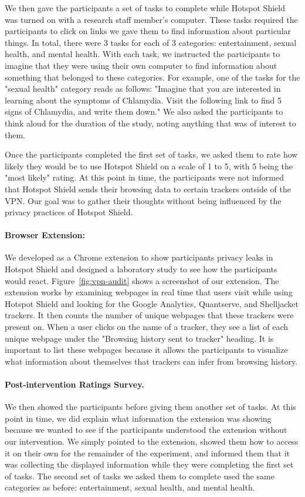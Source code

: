 We then gave the participants a set of tasks to complete while Hotspot Shield
was turned on with a research staff member's computer.  These tasks required
the participants to click on links we gave them to find information about
particular things.  In total, there were 3 tasks for each of 3 categories:
entertainment, sexual health, and mental health.  With each task, we
instructed the participants to imagine that they were using their own computer
to find information about something that belonged to these categories.  For
example, one of the tasks for the "sexual health" category reads as follows:
"Imagine that you are interested in learning about the symptoms of Chlamydia.
Visit the following link to find 5 signs of Chlamydia, and write them down."
We also asked the participants to think aloud for the duration of the study,
noting anything that was of interest to them.

Once the participants completed the first set of tasks, we asked them to rate
how likely they would be to use Hotspot Shield on a scale of 1 to 5, with 5
being the "most likely" rating.  At this point in time, the participants were not
informed that Hotspot Shield sends their browsing data to certain trackers
outside of the VPN.  Our goal was to gather their thoughts without being
influenced by the privacy practices of Hotspot Shield.

\paragraph{Browser Extension: \tool}
We developed \tool as a Chrome extension to show participants privacy leaks
in Hotspot Shield and designed a laboratory study to see how the participants
would react.  Figure~\ref{fig:vpn-audit} shows a screenshot of our extension.
The extension works by examining webpages in real time that users visit while
using Hotspot Shield and looking for the Google Analytics, Quantserve, and
Shelljacket trackers.  It then counts the number of unique webpages that these
trackers were present on.  When a user clicks on the name of a tracker, they
see a list of each unique webpage under the "Browsing history sent to tracker"
heading. It is important to list these webpages because it allows the participants to visualize what information about themselves that trackers can infer from browsing history.


\paragraph{Post-intervention Ratings Survey.}
We then showed the participants \tool before giving them another set of tasks.
At this point in time, we did explain what information the extension was showing because we wanted to see if the participants understood the extension without our intervention.
We simply pointed to the extension, showed them how to access it on their own for the remainder of the experiment, and informed them that it was collecting the displayed information while they were completing the first set of tasks.
The second set of tasks we asked them to complete used the same categories as before: entertainment, sexual health, and mental health.

